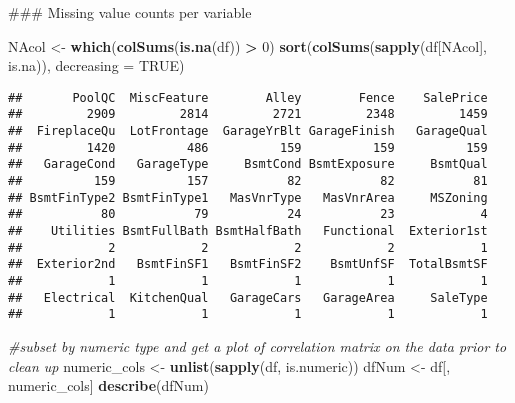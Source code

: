 \documentclass[]{article}
\newenvironment{Shaded}{\begin{snugshade}}{\end{snugshade}}
\newcommand{\KeywordTok}[1]{\textcolor[rgb]{0.13,0.29,0.53}{\textbf{#1}}}
\newcommand{\DataTypeTok}[1]{\textcolor[rgb]{0.13,0.29,0.53}{#1}}
\newcommand{\DecValTok}[1]{\textcolor[rgb]{0.00,0.00,0.81}{#1}}
\newcommand{\StringTok}[1]{\textcolor[rgb]{0.31,0.60,0.02}{#1}}
\newcommand{\CommentTok}[1]{\textcolor[rgb]{0.56,0.35,0.01}{\textit{#1}}}
\newcommand{\OtherTok}[1]{\textcolor[rgb]{0.56,0.35,0.01}{#1}}
\newcommand{\OperatorTok}[1]{\textcolor[rgb]{0.81,0.36,0.00}{\textbf{#1}}}
\newcommand{\NormalTok}[1]{#1}
\begin{document}
\begin{Shaded}
\begin{Highlighting}[]
\NormalTok{### Missing value counts per variable}

\NormalTok{NAcol <-}\StringTok{ }\KeywordTok{which}\NormalTok{(}\KeywordTok{colSums}\NormalTok{(}\KeywordTok{is.na}\NormalTok{(df)) }\OperatorTok{>}\StringTok{ }\DecValTok{0}\NormalTok{)}
\KeywordTok{sort}\NormalTok{(}\KeywordTok{colSums}\NormalTok{(}\KeywordTok{sapply}\NormalTok{(df[NAcol], is.na)), }\DataTypeTok{decreasing =} \OtherTok{TRUE}\NormalTok{)}
\end{Highlighting}
\end{Shaded}

\begin{verbatim}
##       PoolQC  MiscFeature        Alley        Fence    SalePrice 
##         2909         2814         2721         2348         1459 
##  FireplaceQu  LotFrontage  GarageYrBlt GarageFinish   GarageQual 
##         1420          486          159          159          159 
##   GarageCond   GarageType     BsmtCond BsmtExposure     BsmtQual 
##          159          157           82           82           81 
## BsmtFinType2 BsmtFinType1   MasVnrType   MasVnrArea     MSZoning 
##           80           79           24           23            4 
##    Utilities BsmtFullBath BsmtHalfBath   Functional  Exterior1st 
##            2            2            2            2            1 
##  Exterior2nd   BsmtFinSF1   BsmtFinSF2    BsmtUnfSF  TotalBsmtSF 
##            1            1            1            1            1 
##   Electrical  KitchenQual   GarageCars   GarageArea     SaleType 
##            1            1            1            1            1
\end{verbatim}

\begin{Shaded}
\begin{Highlighting}[]
\CommentTok{#subset by numeric type and get a plot of correlation matrix on the data prior to clean up}
\NormalTok{numeric_cols <-}\StringTok{ }\KeywordTok{unlist}\NormalTok{(}\KeywordTok{sapply}\NormalTok{(df, is.numeric))}
\NormalTok{dfNum <-}\StringTok{ }\NormalTok{df[, numeric_cols]}
\KeywordTok{describe}\NormalTok{(dfNum)}
\end{Highlighting}
\end{Shaded}
\end{document}
